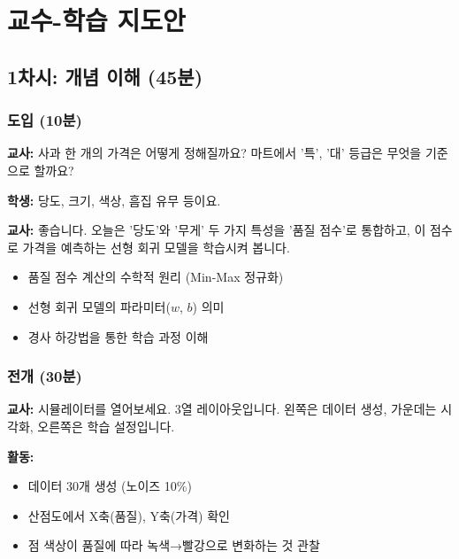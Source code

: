 \documentclass[11pt,a4paper]{article}
\begin{document}
\section{교수-학습 지도안}

\subsection{1차시: 개념 이해 (45분)}

\subsubsection{도입 (10분)}

\begin{tcolorbox}[colback=lightgreen,colframe=applegreen,title=\textbf{【동기유발 - 5분】}]
 \textbf{교사:} 사과 한 개의 가격은 어떻게 정해질까요? 마트에서 '특', '대' 등급은 무엇을 기준으로 할까요?

\vspace{0.2cm}
 \textbf{학생:} 당도, 크기, 색상, 흠집 유무 등이요.

\vspace{0.2cm}
 \textbf{교사:} 좋습니다. 오늘은 '당도'와 '무게' 두 가지 특성을 '품질 점수'로 통합하고, 이 점수로 가격을 예측하는 선형 회귀 모델을 학습시켜 봅니다.
\end{tcolorbox}

\begin{tcolorbox}[colback=warmcream,colframe=applered,title=\textbf{【학습 목표 제시 - 5분】}]
\begin{itemize}
    \item 품질 점수 계산의 수학적 원리 (Min-Max 정규화)
    \item 선형 회귀 모델의 파라미터($w$, $b$) 의미
    \item 경사 하강법을 통한 학습 과정 이해
\end{itemize}
\end{tcolorbox}

\subsubsection{전개 (30분)}

\begin{tcolorbox}[colback=lightgray,colframe=gray,title=\textbf{【시뮬레이터 탐색 - 10분】}]
 \textbf{교사:} 시뮬레이터를 열어보세요. 3열 레이아웃입니다. 왼쪽은 데이터 생성, 가운데는 시각화, 오른쪽은 학습 설정입니다.

\vspace{0.3cm}
\textbf{활동:}
\begin{itemize}
    \item 데이터 30개 생성 (노이즈 10\%)
    \item 산점도에서 X축(품질), Y축(가격) 확인
    \item 점 색상이 품질에 따라 녹색→빨강으로 변화하는 것 관찰
\end{itemize}
\end{tcolorbox}
\end{document}
